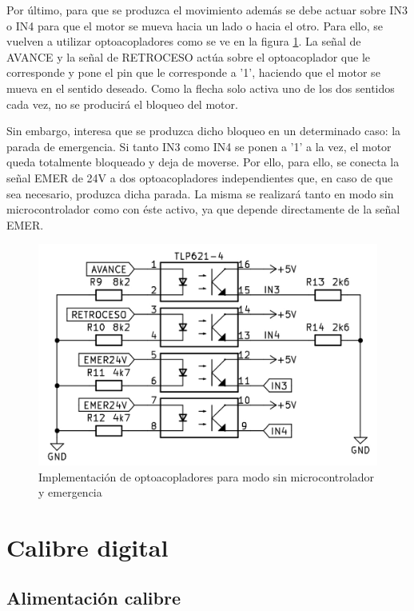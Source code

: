 Por último, para que se produzca el movimiento además se debe actuar sobre IN3 o IN4 para que el motor se
mueva hacia un lado o hacia el otro. Para ello, se vuelven a utilizar optoacopladores como se ve en la
figura \ref{fig:sinmicro}. La señal de AVANCE y la señal de RETROCESO actúa sobre el optoacoplador que
le corresponde y pone el pin que le corresponde a '1', haciendo que el motor se mueva en el sentido deseado.
Como la flecha solo activa uno de los dos sentidos cada vez, no se producirá el bloqueo del motor.

Sin embargo, interesa que se produzca dicho bloqueo en un determinado caso: la parada de emergencia. Si tanto
IN3 como IN4 se ponen a '1' a la vez, el motor queda totalmente bloqueado y deja de moverse. Por ello, para
ello, se conecta la señal EMER de 24V a dos optoacopladores independientes que, en caso de que sea necesario,
produzca dicha parada. La misma se realizará tanto en modo sin microcontrolador como con éste activo, ya que 
depende directamente de la señal EMER.

\begin{figure}[hbtp]
    \centering
    \includegraphics[scale=1.25]{03-placa/sinmicro.jpg}
    \caption{Implementación de optoacopladores para modo sin microcontrolador y emergencia}
    \label{fig:sinmicro}
    \end{figure}

\section{Calibre digital}

\subsection{Alimentación calibre}

